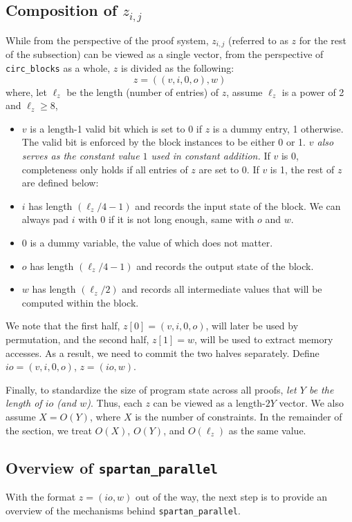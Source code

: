 \documentclass{article}
\newcommand{\code}{\texttt}
\begin{document}
\subsection{Composition of $z_{i, j}$}\label{io_composition}
While from the perspective of the proof system, $z_{i, j}$ (referred to as $z$ for the rest of the subsection) can be viewed as a single vector, from the perspective of \code{circ\_blocks} as a whole, $z$ is divided as the following:
$$z = ((v, i, 0, o), w)$$
where, let $\ell_z$ be the length (number of entries) of $z$, assume $\ell_z$ is a power of 2 and $\ell_z \geq 8$,
\begin{itemize}
    \item $v$ is a length-1 valid bit which is set to 0 if $z$ is a dummy entry, 1 otherwise. The valid bit is enforced by the block instances to be either 0 or 1. \emph{$v$ also serves as the constant value $1$ used in constant addition.} If $v$ is 0, completeness only holds if all entries of $z$ are set to 0. If $v$ is 1, the rest of $z$ are defined below:
    \item $i$ has length $(\ell_z / 4 - 1)$ and records the input state of the block. We can always pad $i$ with 0 if it is not long enough, same with $o$ and $w$.
    \item $0$ is a dummy variable, the value of which does not matter.
    \item $o$ has length $(\ell_z / 4 - 1)$ and records the output state of the block.
    \item $w$ has length $(\ell_z / 2)$ and records all intermediate values that will be computed within the block.
\end{itemize}

We note that the first half, $z[0] = (v, i, 0, o)$, will later be used by permutation, and the second half, $z[1] = w$, will be used to extract memory accesses. As a result, we need to commit the two halves separately. Define $io = (v, i, 0, o)$, $z = (io, w)$.

Finally, to standardize the size of program state across all proofs, \emph{let $Y$ be the length of $io$ (and $w$)}. Thus, each $z$ can be viewed as a length-$2Y$ vector. We also assume $X = O(Y)$, where $X$ is the number of constraints. In the remainder of the section, we treat $O(X)$, $O(Y)$, and $O(\ell_z)$ as the same value.

\subsection{Overview of \code{spartan\_parallel}}
With the format $z = (io, w)$ out of the way, the next step is to provide an overview of the mechanisms behind \code{spartan\_parallel}.
\end{document}
